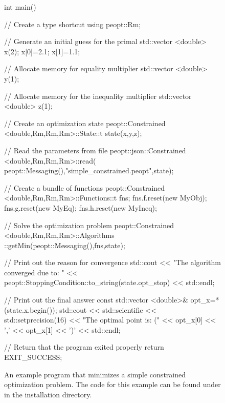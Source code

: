 \begin{figure}
    \ContinuedFloat
    \begin{lstCpp}
int main(){
    // Create a type shortcut
    using peopt::Rm;
    
    // Generate an initial guess for the primal
    std::vector <double> x(2);
    x[0]=2.1; x[1]=1.1;
    
    // Allocate memory for equality multiplier 
    std::vector <double> y(1);
    
    // Allocate memory for the inequality multiplier 
    std::vector <double> z(1);
    
    // Create an optimization state
    peopt::Constrained <double,Rm,Rm,Rm>::State::t state(x,y,z);

    // Read the parameters from file
    peopt::json::Constrained <double,Rm,Rm,Rm>::read(
        peopt::Messaging(),"simple_constrained.peopt",state);

    // Create a bundle of functions
    peopt::Constrained <double,Rm,Rm,Rm>::Functions::t fns;
    fns.f.reset(new MyObj);
    fns.g.reset(new MyEq);
    fns.h.reset(new MyIneq);

    // Solve the optimization problem
    peopt::Constrained <double,Rm,Rm,Rm>::Algorithms
        ::getMin(peopt::Messaging(),fns,state);

    // Print out the reason for convergence
    std::cout << "The algorithm converged due to: " <<
        peopt::StoppingCondition::to_string(state.opt_stop) <<
        std::endl;

    // Print out the final answer
    const std::vector <double>& opt_x=*(state.x.begin());
    std::cout << std::scientific << std::setprecision(16)
        << "The optimal point is: (" << opt_x[0] << ','
        << opt_x[1] << ')' << std::endl;

    // Return that the program exited properly
    return EXIT_SUCCESS;
}
\end{lstCpp}
    \caption{An example program that minimizes a simple constrained optimization problem.  The code for this example can be found under \protect{} in the installation directory.}
    \label{fig:simpleCon}
\end{figure}
